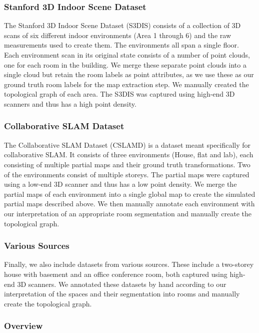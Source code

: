 \subsubsection{Stanford 3D Indoor Scene Dataset}
The Stanford 3D Indoor Scene Dataset (S3DIS) consists of a collection of 3D scans of six different indoor environments (Area 1 through 6) and the raw measurements used to create them. The environments all span a single floor. Each environment scan in its original state consists of a number of point clouds, one for each room in the building. We merge these separate point clouds into a single cloud but retain the room labels as point attributes, as we use these as our ground truth room labels for the map extraction step. We manually created the topological graph of each area. The S3DIS was captured using high-end 3D scanners and thus has a high point density.

\subsubsection{Collaborative SLAM Dataset}
The Collaborative SLAM Dataset (CSLAMD) is a dataset meant specifically for collaborative SLAM. It consists of three environments (House, flat and lab), each consisting of multiple partial maps and their ground truth transformations. Two of the environments consist of multiple storeys. The partial maps were captured using a low-end 3D scanner and thus has a low point density. We merge the partial maps of each environment into a single global map to create the simulated partial maps described above. We then manually annotate each environment with our interpretation of an appropriate room segmentation and manually create the topological graph.

\subsubsection{Various Sources}
Finally, we also include datasets from various sources. These include a two-storey house with basement and an office conference room, both captured using high-end 3D scanners. We annotated these datasets by hand according to our interpretation of the spaces and their segmentation into rooms and manually create the topological graph. 

\subsubsection{Overview}

